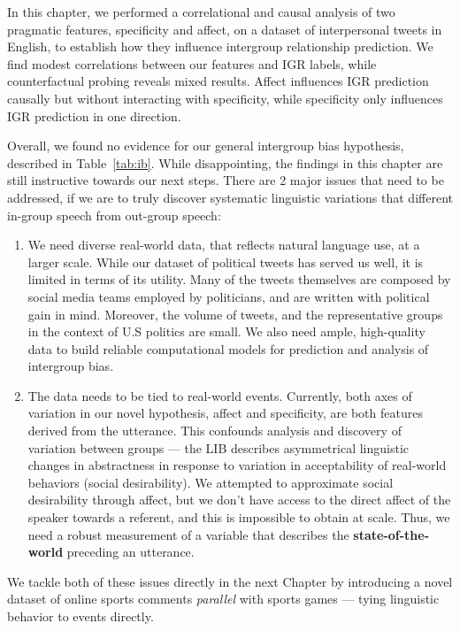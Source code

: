 In this chapter, we performed a correlational and causal analysis of two pragmatic features, specificity and affect, on a dataset of interpersonal tweets in English, to establish how they influence intergroup relationship prediction. We find modest correlations between our features and IGR labels, while counterfactual probing reveals mixed results. Affect influences IGR prediction causally but without interacting with specificity, while specificity only influences IGR prediction in one direction. 

Overall, we found no evidence for our general intergroup bias hypothesis, described in Table~\ref{tab:ib}. While disappointing, the findings in this chapter are still instructive towards our next steps. There are 2 major issues that need to be addressed, if we are to truly discover systematic linguistic variations that different in-group speech from out-group speech:

\begin{enumerate}
    \item We need diverse real-world data, that reflects natural language use, at a larger scale. While our dataset of political tweets has served us well, it is limited in terms of its utility. Many of the tweets themselves are composed by social media teams employed by politicians, and are written with political gain in mind. Moreover, the volume of tweets, and the representative groups in the context of U.S politics are small. We also need ample, high-quality data to build reliable computational models for prediction and analysis of intergroup bias.
    \item The data needs to be tied to real-world events. Currently, both axes of variation in our novel hypothesis, affect and specificity, are both features derived from the utterance. This confounds analysis and discovery of variation between groups --- the LIB describes asymmetrical linguistic changes in abstractness in response to variation in acceptability of real-world behaviors (social desirability). We attempted to approximate social desirability through affect, but we don't have access to the direct affect of the speaker towards a referent, and this is impossible to obtain at scale. Thus, we need a robust measurement of a variable that describes the \textbf{state-of-the-world} preceding an utterance.
\end{enumerate}

We tackle both of these issues directly in the next Chapter by introducing a novel dataset of online sports comments \emph{parallel} with sports games --- tying linguistic behavior to events directly. 
